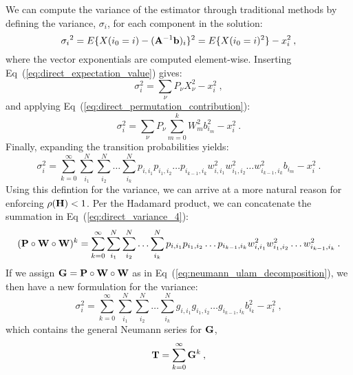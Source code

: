 We can compute the variance of the estimator through traditional
methods by defining the variance, $\sigma_i$, for each component in
the solution:
\begin{equation}
  {\sigma_i}^2 = E\{X(i_0 = i) - (\mathbf{A}^{-1}\mathbf{b})_i\}^2 = E\{X(i_0
  = i)^2\} - x_i^2\:,
  \label{eq:direct_variance_1}
\end{equation}
where the vector exponentials are computed element-wise. Inserting
Eq~(\ref{eq:direct_expectation_value}) gives:
\begin{equation}
  \sigma_i^2 = \sum_{\nu} P_{\nu} X_{\nu}^2 - x_i^2\:,
  \label{eq:direct_variance_2}
\end{equation}
and applying Eq~(\ref{eq:direct_permutation_contribution}):
\begin{equation}
  \sigma_i^2 = \sum_{\nu} P_{\nu} \sum_{m=0}^k W_{m}^2 b_{i_m}^2 -
  x_i^2\:.
  \label{eq:direct_variance_3}
\end{equation}
Finally, expanding the transition probabilities yields:
\begin{equation}
  \sigma_i^2 = \sum_{k=0}^{\infty}\sum_{i_1}^{N}\sum_{i_2}^{N}\ldots
  \sum_{i_k}^{N} p_{i,i_1}p_{i_1,i_2}\ldots p_{i_{k-1},i_k}
  w^2_{i,i_1}w^2_{i_1,i_2}\ldots w^2_{i_{k-1},i_k} b_{i_m} - x_i^2\:.
  \label{eq:direct_variance_4}
\end{equation}
Using this defintion for the variance, we can arrive at a more natural
reason for enforcing $\rho(\mathbf{H}) < 1$. Per the Hadamard product, we can
concatenate the summation in Eq~(\ref{eq:direct_variance_4}):
\begin{equation}
  (\mathbf{P} \circ \mathbf{W} \circ \mathbf{W})^k =
  \sum_{k=0}^{\infty}\sum_{i_1}^{N}\sum_{i_2}^{N}\ldots \sum_{i_k}^{N}
  p_{i,i_1}p_{i_1,i_2}\ldots p_{i_{k-1},i_k}
  w^2_{i,i_1}w^2_{i_1,i_2}\ldots w^2_{i_{k-1},i_k}\:.
  \label{eq:double_weighted_decomposition}
\end{equation}
If we assign $\mathbf{G} = \mathbf{P} \circ \mathbf{W} \circ \mathbf{W}$ as in
Eq~(\ref{eq:neumann_ulam_decomposition}), we then have a new
formulation for the variance:
\begin{equation}
  \sigma^2_i = \sum_{k=0}^{\infty}\sum_{i_1}^{N}\sum_{i_2}^{N}\ldots
  \sum_{i_k}^{N}g_{i,i_1}g_{i_1,i_2}\ldots g_{i_{k-1},i_k} b_{i_k}^2 -
  x_i^2\:,
\end{equation}
which contains the general Neumann series for $\mathbf{G}$,
\begin{equation}
  \mathbf{T} = \sum_{k=0}^{\infty} \mathbf{G}^k\:,
  \label{eq:variance_neumann_series}
\end{equation}
